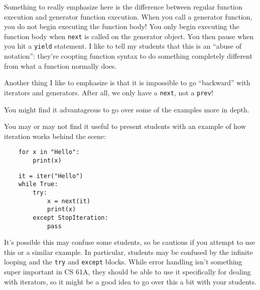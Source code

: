 \begin{meta}
Something to really emphasize here is the difference between regular function execution and generator function execution. When you call a generator function, you do not begin executing the function body! You only begin executing the function body when \lstinline{next} is called on the generator object. You then pause when you hit a \lstinline{yield} statement. I like to tell my students that this is an ``abuse of notation'': they're coopting function syntax to do something completely different from what a function normally does. 

Another thing I like to emphasize is that it is impossible to go ``backward'' with iterators and generators. After all, we only have a \lstinline{next}, not a \lstinline{prev}!

You might find it advantageous to go over some of the examples more in depth. 

You may or may not find it useful to present students with an example of how iteration works behind the scene: 

\begin{center}
    \begin{minipage}[t]{0.4\textwidth}
    \begin{lstlisting}
    for x in "Hello":
        print(x)
    \end{lstlisting}
    \end{minipage}
    \begin{minipage}[t]{0.4\textwidth}
    \begin{lstlisting}
    it = iter("Hello")
    while True:
        try: 
            x = next(it)
            print(x)
        except StopIteration:
            pass
    \end{lstlisting}
    \end{minipage}
    \end{center}

It's possible this may confuse some students, so be cautious if you attempt to use this or a similar example. In particular, students may be confused by the infinite looping and the \lstinline{try} and \lstinline{except} blocks. While error handling isn't something super important in CS 61A, they should be able to use it specifically for dealing with iterators, so it might be a good idea to go over this a bit with your students. 
\end{meta}